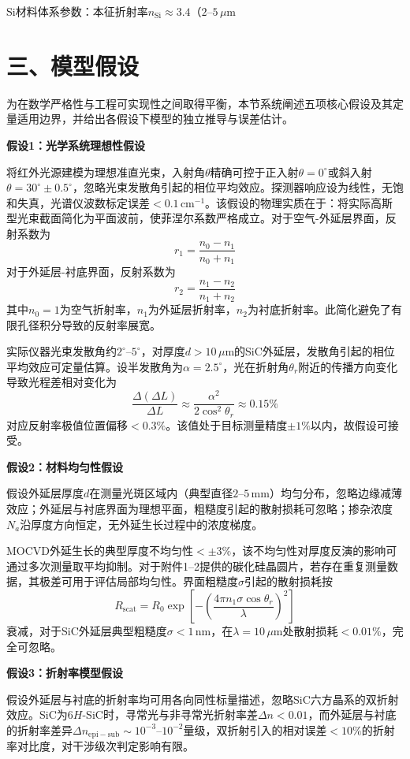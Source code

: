 \documentclass{mcmthesis}
\begin{document}
Si材料体系参数：本征折射率$n_{\mathrm{Si}}\approx 3.4$（$2$–$5\,\mu\mathrm{m}$


\section{ 三、模型假设}

为在数学严格性与工程可实现性之间取得平衡，本节系统阐述五项核心假设及其定量适用边界，并给出各假设下模型的独立推导与误差估计。

\textbf{假设1：光学系统理想性假设}

将红外光源建模为理想准直光束，入射角$\theta$精确可控于正入射$\theta=0^\circ$或斜入射$\theta=30^\circ\pm0.5^\circ$，忽略光束发散角引起的相位平均效应。探测器响应设为线性，无饱和失真，光谱仪波数标定误差$<0.1\,\mathrm{cm}^{-1}$。该假设的物理实质在于：将实际高斯型光束截面简化为平面波前，使菲涅尔系数严格成立。对于空气-外延层界面，反射系数为
$$r_1=\frac{n_0-n_1}{n_0+n_1} \tag{1}$$
对于外延层-衬底界面，反射系数为
$$r_2=\frac{n_1-n_2}{n_1+n_2} \tag{2}$$
其中$n_0=1$为空气折射率，$n_1$为外延层折射率，$n_2$为衬底折射率。此简化避免了有限孔径积分导致的反射率展宽。

实际仪器光束发散角约$2^\circ$–$5^\circ$，对厚度$d>10\,\mu\mathrm{m}$的SiC外延层，发散角引起的相位平均效应可定量估算。设半发散角为$\alpha=2.5^\circ$，光在折射角$\theta_r$附近的传播方向变化导致光程差相对变化为
$$\frac{\Delta(\Delta L)}{\Delta L} \approx \frac{\alpha^2}{2\cos^2\theta_r}\approx 0.15\% \tag{3}$$
对应反射率极值位置偏移$<0.3\%$。该值处于目标测量精度$\pm1\%$以内，故假设可接受。

\textbf{假设2：材料均匀性假设}

假设外延层厚度$d$在测量光斑区域内（典型直径$2$–$5\,\mathrm{mm}$）均匀分布，忽略边缘减薄效应；外延层与衬底界面为理想平面，粗糙度引起的散射损耗可忽略；掺杂浓度$N_a$沿厚度方向恒定，无外延生长过程中的浓度梯度。

MOCVD外延生长的典型厚度不均匀性$<\pm3\%$，该不均匀性对厚度反演的影响可通过多次测量取平均抑制。对于附件1–2提供的碳化硅晶圆片，若存在重复测量数据，其极差可用于评估局部均匀性。界面粗糙度$\sigma$引起的散射损耗按
$$R_{\mathrm{scat}} = R_0\exp\left[-\left(\frac{4\pi n_1\sigma\cos\theta_r}{\lambda}\right)^2\right] \tag{4}$$
衰减，对于SiC外延层典型粗糙度$\sigma<1\,\mathrm{nm}$，在$\lambda=10\,\mu\mathrm{m}$处散射损耗$<0.01\%$，完全可忽略。

\textbf{假设3：折射率模型假设}

假设外延层与衬底的折射率均可用各向同性标量描述，忽略SiC六方晶系的双折射效应。SiC为$6H$-SiC时，寻常光与非寻常光折射率差$\Delta n<0.01$，而外延层与衬底的折射率差异$\Delta n_{\mathrm{epi-sub}}\sim10^{-3}$–$10^{-2}$量级，双折射引入的相对误差$<10\%$的折射率对比度，对干涉级次判定影响有限。
\end{document}
